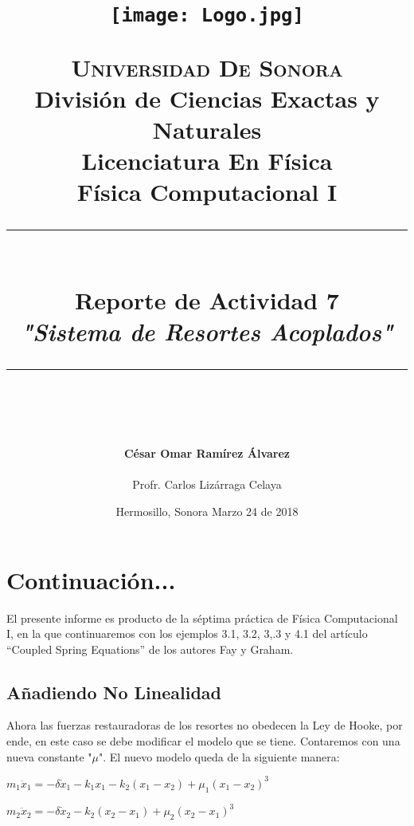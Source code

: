 \documentclass[12pt]{article}
\newcommand{\HRule}[1]{\rule{\linewidth}{#1}}
\begin{document}
\begin{titlepage}

\title{ \normalsize 
        \begin{center}
        \texttt{[image: Logo.jpg]}
        \end{center}
        \LARGE \textsc{\textbf{Universidad De Sonora}} \\ \bigskip
		\Large División de Ciencias Exactas y Naturales \\
        Licenciatura En Física \\ \bigskip
        \bigskip
        Física Computacional I
		\\ [0.1cm]  
		\HRule{2pt} \\
		\Large \textbf{{Reporte de Actividad 7}} \\
        \textit{\textbf{"Sistema de Resortes Acoplados"}}
		\HRule{2pt} \\
		\normalsize \vspace*{0.001\baselineskip}}
        
\date{\bigskip \Large Hermosillo, Sonora  \hspace*{\fill}  Marzo 24 de 2018}

        
\author{
		\Large\textbf{ César Omar Ramírez Álvarez} \\ \bigskip
        \\ \bigskip
       \Large Profr. Carlos Lizárraga Celaya}
       \end{titlepage}
       \maketitle
       

\newpage
\pagestyle{plain}
\section*{Continuación...}
El presente informe es producto de la séptima práctica de Física Computacional I, en la que continuaremos con los ejemplos 3.1, 3.2, 3,.3 y 4.1 del artículo “Coupled Spring Equations” de los autores Fay y Graham.
\subsection*{Añadiendo No Linealidad}
Ahora las fuerzas restauradoras de los resortes no obedecen la Ley de Hooke, por ende, en este caso se debe modificar el modelo que se tiene. Contaremos con una nueva constante "$\mu$". El nuevo modelo queda de la siguiente manera:\\
\centerline{$m_1 \ddot x_1 = -\delta \dot x_1 -k_1x_1 - k_2(x_1-x_2) + \mu_1 (x_1-x_2)^3$}
\centerline{$m_2 \ddot x_2 = -\delta \dot x_2 -k_2(x_2-x_1) + \mu_2 (x_2-x_1)^3$} \\
\end{document}
